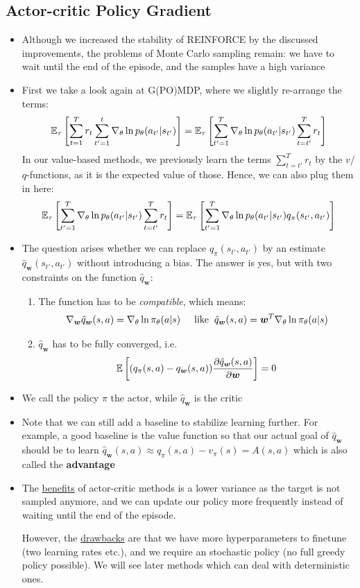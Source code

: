 \subsection{Actor-critic Policy Gradient}
\begin{itemize}
	\item Although we increased the stability of REINFORCE by the discussed improvements, the problems of Monte Carlo sampling remain: we have to wait until the end of the episode, and the samples have a high variance
	\item First we take a look again at G(PO)MDP, where we slightly re-arrange the terms:
	$$\mathbb{E}_{\tau}\left[\sum_{t=1}^{T}  r_t \sum_{t'=1}^{t}\nabla_{\theta} \ln p_{\theta}(a_{t'}|s_{t'}) \right] = \mathbb{E}_{\tau}\left[\sum_{t'=1}^{T}\nabla_{\theta} \ln p_{\theta}(a_{t'}|s_{t'}) \sum_{t=t'}^{T}  r_t\right]$$
	In our value-based methods, we previously learn the terms $\sum_{t=t'}^{T}  r_t$ by the $v$/$q$-functions, as it is the expected value of those. Hence, we can also plug them in here:
	$$\mathbb{E}_{\tau}\left[\sum_{t'=1}^{T}\nabla_{\theta} \ln p_{\theta}(a_{t'}|s_{t'}) \sum_{t=t'}^{T}  r_t\right] = \mathbb{E}_{\tau}\left[\sum_{t'=1}^{T}\nabla_{\theta} \ln p_{\theta}(a_{t'}|s_{t'}) q_{\pi}(s_{t'},a_{t'})\right]$$
	\item The question arises whether we can replace $q_{\pi}(s_{t'},a_{t'})$ by an estimate $\hat{q}_{\bm{w}}(s_{t'},a_{t'})$ without introducing a bias. The answer is yes, but with two constraints on the function $\hat{q}_{\bm{w}}$:
	\begin{enumerate}
		\item The function has to be \textit{compatible}, which means:
		$$\nabla_{\bm{w}}\hat{q}_{\bm{w}}(s,a) = \nabla_{\theta}\ln \pi_{\theta}(a|s)\hspace{5mm}\text{like}\hspace{2mm} \hat{q}_{\bm{w}}(s,a)=\bm{w}^T \nabla_{\theta} \ln \pi_{\theta}(a|s)$$
		\item $\hat{q}_{\bm{w}}$ has to be fully converged, i.e.
		$$\mathbb{E}\left[(q_{\pi}(s,a)-q_{\bm{w}}(s,a)) \frac{\partial \hat{q}_{\bm{w}}(s,a)}{\partial \bm{w}}\right]= 0$$
	\end{enumerate}
	\item We call the policy $\pi$ the actor, while $\hat{q}_{\bm{w}}$ is the critic
	\item Note that we can still add a baseline to stabilize learning further. For example, a good baseline is the value function so that our actual goal of $\hat{q}_{\bm{w}}$ should be to learn $\hat{q}_{\bm{w}}(s,a)\approx q_{\pi}(s,a)-v_{\pi}(s)=A(s,a)$ which is also called the \textbf{advantage}
	\item The \underline{benefits} of actor-critic methods is a lower variance as the target is not sampled anymore, and we can update our policy more frequently instead of waiting until the end of the episode.
	
	However, the \underline{drawbacks} are that we have more hyperparameters to finetune (two learning rates etc.), and we require an stochastic policy (no full greedy policy possible). We will see later methods which can deal with deterministic ones.
\end{itemize}
